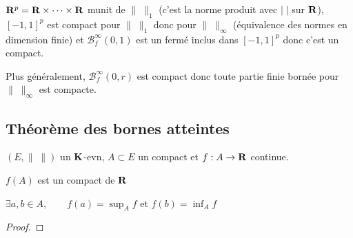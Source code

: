  \begin{rem}
     $\mathbf R^p=\mathbf R\times \cdots \times \mathbf R$ munit de $\|\;\|_1$ (c'est la norme produit avec $|\;|$ sur  $\mathbf R$), $[-1,1]^p$ est compact pour  $\|\;\|_1$ donc pour $\|\;\|_\infty$ (équivalence des normes en dimension finie) et $\mathcal  B_f^\infty(0,1)$ est un fermé inclus dans $[-1,1]^p$ donc c'est un compact.

     Plus généralement,  $\mathcal  B_f^\infty(0,r)$ est compact donc toute partie finie bornée pour $\|\;\|_\infty$ est compacte.
 \end{rem}

 \subsection{Théorème des bornes atteintes}

 \begin{thm}
     \Hyp $(E, \|\;\|)$ un $\mathbf K$-evn, $A\subset E$ un compact et  $f:A\to \mathbf R$ continue.
\begin{concenum}
\item $f(A)$ est un compact de  $\mathbf R$
\item $ \exists  a,b\in A,\quad \quad f(a)=\sup_A\limits f$ et $f(b)=\inf_A\limits f$
\end{concenum}
 \end{thm}

 \begin{proof}
 
 \end{proof}
